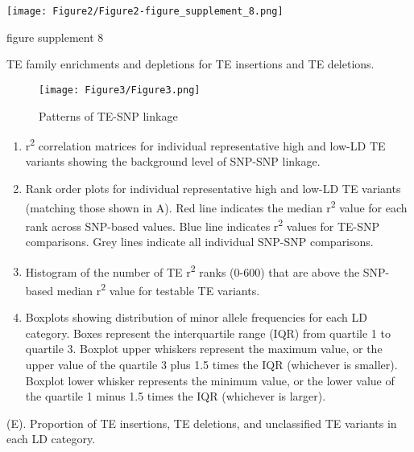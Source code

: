 \documentclass[12pt]{article}
\begin{document}
\pagebreak

\setcounter{suppfigure}{1}

\begin{suppfigure}[!ht]
  \centering
  \texttt{[image: Figure2/Figure2-figure\_supplement\_8.png]}
  \caption{figure supplement 8}
  \label{fig2s8}
\end{suppfigure}

TE family enrichments and depletions for TE insertions and TE deletions.

\pagebreak


\begin{figure}[!ht]
  \centering
  \texttt{[image: Figure3/Figure3.png]}
  \caption{Patterns of TE-SNP linkage}
  \label{fig3}
\end{figure}

\begin{enumerate}
\def\labelenumi{(\Alph{enumi})}
\item
  r\textsuperscript{2} correlation matrices for individual representative high and low-LD
  TE variants showing the background level of SNP-SNP linkage.
\item
  Rank order plots for individual representative high and low-LD TE
  variants (matching those shown in A). Red line indicates the median r\textsuperscript{2}
  value for each rank across SNP-based values. Blue line indicates r\textsuperscript{2}
  values for TE-SNP comparisons. Grey lines indicate all individual
  SNP-SNP comparisons.
\item
  Histogram of the number of TE r\textsuperscript{2} ranks (0-600) that are above the
  SNP-based median r\textsuperscript{2} value for testable TE variants.
\item
  Boxplots showing distribution of minor allele frequencies for each LD
  category. Boxes represent the interquartile range (IQR) from quartile
  1 to quartile 3. Boxplot upper whiskers represent the maximum value,
  or the upper value of the quartile 3 plus 1.5 times the IQR (whichever
  is smaller). Boxplot lower whisker represents the minimum value, or
  the lower value of the quartile 1 minus 1.5 times the IQR (whichever
  is larger).
\end{enumerate}

(E). Proportion of TE insertions, TE deletions, and unclassified TE
variants in each LD category.

\pagebreak
\end{document}
